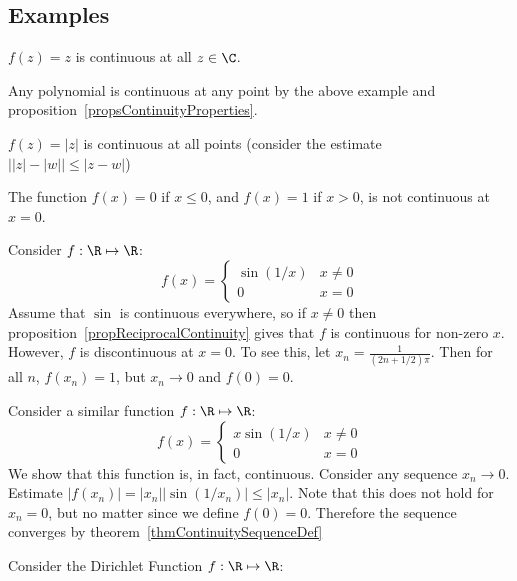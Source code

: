 \documentclass[../Main.tex]{subfiles}
\begin{document}
\subsection{Examples}
\begin{examples}{\label{exContinuityExamples}}
    \item $f(z) = z$ is continuous at all $z \in \C$.
    \item Any polynomial is continuous at any point by the above example and proposition~\ref{propsContinuityProperties}.
    \item $f(z) = |z|$ is continuous at all points (consider the estimate \\ $\big ||z| - |w|\big | \leq |z - w|$)
    \item The function $f(x) = 0$ if $x \leq 0$, and $f(x) = 1$ if $x > 0$, is not continuous at $x = 0$. \label{exStepDiscontinuity}
    \item Consider $f : \R \mapsto \R$:
        \begin{equation*}
            f(x) =
            \begin{cases}
                \sin{(1/x)} & x \neq 0 \\
                0 & x = 0
            \end{cases}
        \end{equation*}
        Assume that $\sin$ is continuous everywhere, so if $x \neq 0$ then proposition~\ref{propReciprocalContinuity} gives that $f$ is continuous for non-zero $x$. However, $f$ is discontinuous at $x = 0$. To see this, let $x_n = \frac{1}{(2n + 1/2)\pi}$. Then for all $n$, $f(x_n) = 1$, but $x_n \to 0$ and $f(0) = 0$.
        \label{exSinOneOverXDiscontinuity}
    \item Consider a similar function $f : \R \mapsto \R$:
        \begin{equation*}
            f(x) = 
            \begin{cases}
                x \sin{(1/x)} & x \neq 0 \\
                0 & x = 0
            \end{cases}
        \end{equation*}
        We show that this function is, in fact, continuous. Consider any sequence $x_n \to 0$. Estimate $|f(x_n)| = |x_n| |\sin{(1/x_n)}| \leq |x_n|$. Note that this does not hold for $x_n = 0$, but no matter since we define $f(0) = 0$. Therefore the sequence converges by theorem~\ref{thmContinuitySequenceDef}
        \label{exXSinOneOverXContinuity}
    \item Consider the Dirichlet Function $f : \R \mapsto \R$:

\end{examples}
\end{document}
